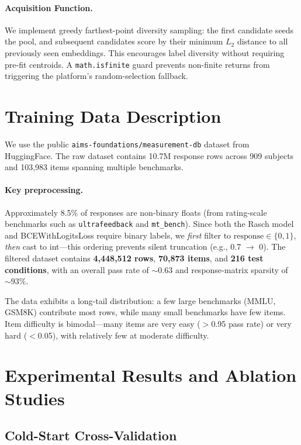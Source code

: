 \documentclass{article}
\begin{document}
\paragraph{Acquisition Function.}
We implement greedy farthest-point diversity sampling: the first candidate seeds the pool, and subsequent candidates score by their minimum $L_2$ distance to all previously seen embeddings.
This encourages label diversity without requiring pre-fit centroids.
A \texttt{math.isfinite} guard prevents non-finite returns from triggering the platform's random-selection fallback.

\section{Training Data Description}

We use the public \texttt{aims-foundations/measurement-db} dataset from HuggingFace.
The raw dataset contains 10.7M response rows across 909 subjects and 103,983 items spanning multiple benchmarks.

\paragraph{Key preprocessing.}
Approximately 8.5\% of responses are non-binary floats (from rating-scale benchmarks such as \texttt{ultrafeedback} and \texttt{mt\_bench}).
Since both the Rasch model and BCEWithLogitsLoss require binary labels, we \emph{first} filter to $\text{response} \in \{0, 1\}$, \emph{then} cast to int---this ordering prevents silent truncation (e.g., 0.7 $\to$ 0).
The filtered dataset contains \textbf{4,448,512 rows}, \textbf{70,873 items}, and \textbf{216 test conditions}, with an overall pass rate of ${\sim}0.63$ and response-matrix sparsity of ${\sim}93\%$.

The data exhibits a long-tail distribution: a few large benchmarks (MMLU, GSM8K) contribute most rows, while many small benchmarks have few items.
Item difficulty is bimodal---many items are very easy ($>$0.95 pass rate) or very hard ($<$0.05), with relatively few at moderate difficulty.

\section{Experimental Results and Ablation Studies}

\subsection{Cold-Start Cross-Validation}
\end{document}
